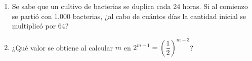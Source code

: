 \documentclass[11pt, letterpaper]{article}
\begin{document}
\begin{enumerate}[label=\textbf{\arabic*.}, leftmargin=*]
\item
\begin{minipage}[t]{\linewidth}
Se sabe que un cultivo de bacterias se duplica cada 24 horas. Si al comienzo se partió con 1.000 bacterias, ¿al cabo de cuántos días la cantidad inicial se multiplicó por 64?
\\%
\begin{minipage}{\linewidth}
\vspace{7mm}
\end{minipage}
\vspace{7mm}
\end{minipage}

\item
\begin{minipage}[t]{\linewidth}
¿Qué valor se obtiene al calcular $m$ en $2^{m-1}=\left(\dfrac{1}{2}\right)^{m-3}$?
\\%
\begin{minipage}{\linewidth}
\vspace{7mm}
\end{minipage}
\vspace{7mm}
\end{minipage}


\end{enumerate}
\end{document}
